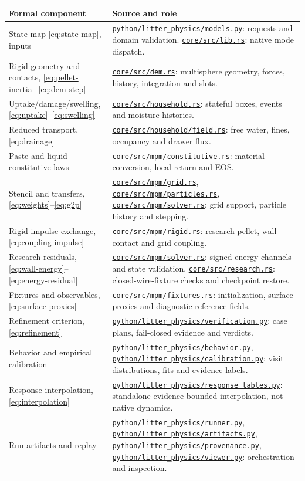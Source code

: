 \documentclass[11pt,a4paper]{article}
\numberwithin{equation}{section}
\newcommand{\source}[1]{\href{https://github.com/nredd/litter-physics/blob/9a66a559ed478629d514756662a8fd98a8f52f50/#1}{\nolinkurl{#1}}}
\begin{document}
\small
\begin{longtable}{>{\raggedright\arraybackslash}p{.29\linewidth}>{\raggedright\arraybackslash}p{.65\linewidth}}
\toprule
Formal component & Source and role\\
\midrule\endhead
State map \eqref{eq:state-map}, inputs &
\source{python/litter_physics/models.py}: requests and domain validation.
\source{core/src/lib.rs}: native mode dispatch.\\[.6em]
Rigid geometry and contacts, \eqref{eq:pellet-inertia}--\eqref{eq:dem-step} &
\source{core/src/dem.rs}: multisphere geometry, forces, history, integration and slots.\\[.6em]
Uptake/damage/swelling, \eqref{eq:uptake}--\eqref{eq:swelling} &
\source{core/src/household.rs}: stateful boxes, events and moisture histories.\\[.6em]
Reduced transport, \eqref{eq:drainage} &
\source{core/src/household/field.rs}: free water, fines, occupancy and drawer flux.\\[.6em]
Paste and liquid constitutive laws &
\source{core/src/mpm/constitutive.rs}: material conversion, local return and EOS.\\[.6em]
Stencil and transfers, \eqref{eq:weights}--\eqref{eq:g2p} &
\source{core/src/mpm/grid.rs}, \source{core/src/mpm/particles.rs},
\source{core/src/mpm/solver.rs}: grid support, particle history and stepping.\\[.6em]
Rigid impulse exchange, \eqref{eq:coupling-impulse} &
\source{core/src/mpm/rigid.rs}: research pellet, wall contact and grid coupling.\\[.6em]
Research residuals, \eqref{eq:wall-energy}--\eqref{eq:energy-residual} &
\source{core/src/mpm/solver.rs}: signed energy channels and state validation.
\source{core/src/research.rs}: closed-wire-fixture checks and checkpoint restore.\\[.6em]
Fixtures and observables, \eqref{eq:surface-proxies} &
\source{core/src/mpm/fixtures.rs}: initialization, surface proxies and diagnostic reference fields.\\[.6em]
Refinement criterion, \eqref{eq:refinement} &
\source{python/litter_physics/verification.py}: case plans, fail-closed evidence and verdicts.\\[.6em]
Behavior and empirical calibration &
\source{python/litter_physics/behavior.py},
\source{python/litter_physics/calibration.py}: visit distributions, fits and evidence labels.\\[.6em]
Response interpolation, \eqref{eq:interpolation} &
\source{python/litter_physics/response_tables.py}: standalone evidence-bounded interpolation,
not native dynamics.\\[.6em]
Run artifacts and replay &
\source{python/litter_physics/runner.py},
\source{python/litter_physics/artifacts.py},
\source{python/litter_physics/provenance.py},
\source{python/litter_physics/viewer.py}: orchestration and inspection.\\
\bottomrule
\end{longtable}
\normalsize
\end{document}
